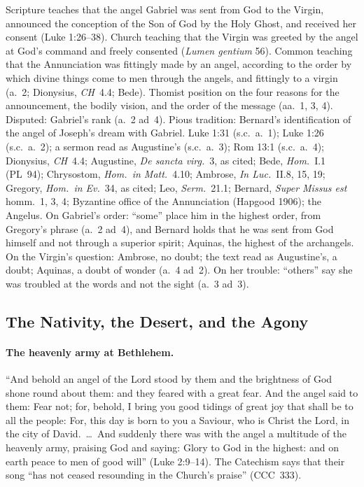  {Scripture teaches that the angel Gabriel was sent from God to the Virgin,
  announced the conception of the Son of God by the Holy Ghost, and received
  her consent (Luke 1:26--38). Church teaching that the Virgin was greeted
  by the angel at God's command and freely consented (\emph{Lumen gentium}
  56). Common teaching that the Annunciation was fittingly made by an angel,
  according to the order by which divine things come to men through the
  angels, and fittingly to a virgin (a.~2; Dionysius, \emph{CH}~4.4; Bede).
  Thomist position on the four reasons for the announcement, the bodily
  vision, and the order of the message (aa.~1, 3, 4). Disputed: Gabriel's
  rank (a.~2 ad~4). Pious tradition: Bernard's identification of the angel
  of Joseph's dream with Gabriel.}
 {Luke 1:31 (s.c.\ a.~1); Luke 1:26 (s.c.\ a.~2); a sermon read as
  Augustine's (s.c.\ a.~3); Rom 13:1 (s.c.\ a.~4); Dionysius, \emph{CH}~4.4; Augustine, \emph{De sancta virg.}\ 3, as cited; Bede, \emph{Hom.}\
  I.1 (PL~94); Chrysostom, \emph{Hom.\ in Matt.}\ 4.10; Ambrose, \emph{In
  Luc.}\ II.8, 15, 19; Gregory, \emph{Hom.\ in Ev.}\ 34, as cited; Leo,
  \emph{Serm.}\ 21.1; Bernard, \emph{Super Missus est} homm.~1, 3, 4;
  Byzantine office of the Annunciation (Hapgood 1906); the Angelus.}
 {On Gabriel's order: ``some'' place him in the highest order, from
  Gregory's phrase (a.~2 ad~4), and Bernard holds that he was sent from God
  himself and not through a superior spirit; Aquinas, the highest of the
  archangels. On the Virgin's question: Ambrose, no doubt; the text read as
  Augustine's, a doubt; Aquinas, a doubt of wonder (a.~4 ad~2). On her
  trouble: ``others'' say she was troubled at the words and not the sight
  (a.~3 ad~3).}

\sectionguard
\subsection{The Nativity, the Desert, and the Agony}\label{sec:cm-life}

\paragraph{The heavenly army at Bethlehem.} ``And behold an angel of the
Lord stood by them and the brightness of God shone round about them: and
they feared with a great fear. And the angel said to them: Fear not; for,
behold, I bring you good tidings of great joy that shall be to all the
people: For, this day is born to you a Saviour, who is Christ the Lord, in
the city of David.~\dots\ And suddenly there was with the angel a multitude
of the heavenly army, praising God and saying: Glory to God in the highest:
and on earth peace to men of good will'' (Luke 2:9--14). The Catechism
says that their song ``has not ceased resounding in the Church's praise''
(CCC~333).


